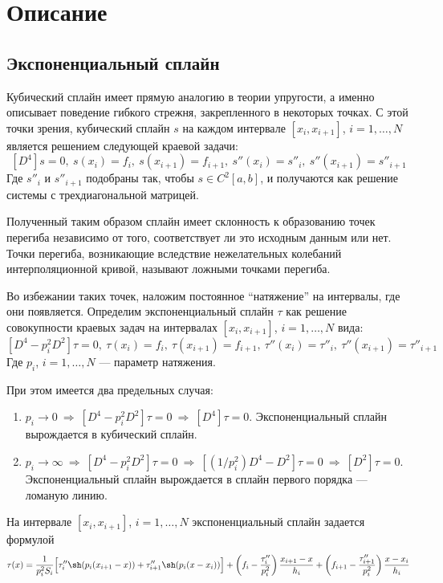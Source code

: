 \section{Описание}

\subsection*{Экспоненциальный сплайн}

Кубический сплайн имеет прямую аналогию в теории упругости, а именно описывает поведение гибкого стрежня, закрепленного в некоторых точках. С этой точки зрения, кубический сплайн $s$ на каждом интервале $[x_i, x_{i+1}]$, $i = 1, \ldots, N$ является решением следующей краевой задачи:
$$[D^4]s = 0,\ s(x_i) = f_i,\ s(x_{i+1}) = f_{i+1},\ s''(x_i) = s''_i,\ s''(x_{i+1}) = s''_{i+1}$$
Где $s''_i$ и $s''_{i+1}$ подобраны так, чтобы $s \in C^2[a,b]$, и получаются как решение системы с трехдиагональной матрицей.

Полученный таким образом сплайн имеет склонность к образованию точек перегиба независимо от того, соответствует ли это исходным данным или нет. Точки перегиба, возникающие вследствие нежелательных колебаний интерполяционной кривой, называют ложными точками перегиба.

Во избежании таких точек, наложим постоянное \enquote{натяжение} на интервалы, где они появляется. Определим экспоненциальный сплайн $\tau$ как решение совокупности краевых задач на интервалах $[x_i, x_{i+1}]$, $i = 1, \ldots, N$ вида:
$$[D^4 - p^2_i D^2]\tau = 0,\ \tau(x_i) = f_i,\ \tau(x_{i+1}) = f_{i+1},\ \tau''(x_i) = \tau''_i,\ \tau''(x_{i+1}) = \tau''_{i+1}$$
Где $p_i$, $i = 1, \ldots, N$ --- параметр натяжения.

При этом имеется два предельных случая:
\begin{enumerate}
	\item $p_i \rightarrow 0 \ \Rightarrow \ [D^4 - p^2_i D^2]\tau = 0 \ \Rightarrow \ [D^4]\tau = 0$. Экспоненциальный сплайн вырождается в кубический сплайн.
	\item $p_i \rightarrow \infty \ \Rightarrow \ [D^4 - p^2_i D^2]\tau = 0 \ \Rightarrow \ [(1/p^2_i)D^4 - D^2]\tau = 0 \ \Rightarrow \ [D^2]\tau = 0$. Экспоненциальный сплайн вырождается в сплайн первого порядка --- ломаную линию.
\end{enumerate}

На интервале $[x_i, x_{i+1}]$, $i = 1, \ldots, N$ экспоненциальный сплайн задается формулой
$$\tau(x) = \frac{1}{p_i^2 S_i}\Big[\tau''_i \sh(p_i(x_{i+1} - x)) + \tau''_{i+1} \sh(p_i(x - x_i))\Big] + 
\left(f_i - \frac{\tau''_i}{p_i^2}\right)\frac{x_{i+1}-x}{h_i} + 
\left(f_{i+1} - \frac{\tau''_{i+1}}{p_i^2}\right)\frac{x-x_i}{h_i}$$

